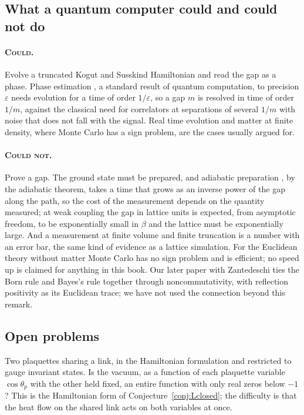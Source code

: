 \subsection{What a quantum computer could and could not do}

\paragraph{\normalfont\scshape Could.} Evolve a truncated Kogut and Susskind Hamiltonian and read the gap as a phase. Phase estimation \cite{Ki95}, a standard result of quantum computation, to precision $\varepsilon$ needs evolution for a time of order $1/\varepsilon$, so a gap $m$ is resolved in time of order $1/m$, against the classical need for correlators at separations of several $1/m$ with noise that does not fall with the signal. Real time evolution and matter at finite density, where Monte Carlo has a sign problem, are the cases usually argued for.

\paragraph{\normalfont\scshape Could not.} Prove a gap. The ground state must be prepared, and adiabatic preparation \cite{FGGS00}, by the adiabatic theorem, takes a time that grows as an inverse power of the gap along the path, so the cost of the measurement depends on the quantity measured; at weak coupling the gap in lattice units is expected, from asymptotic freedom, to be exponentially small in $\beta$ and the lattice must be exponentially large. And a measurement at finite volume and finite truncation is a number with an error bar, the same kind of evidence as a lattice simulation. For the Euclidean theory without matter Monte Carlo has no sign problem and is efficient; no speed up is claimed for anything in this book. Our later paper with Zantedeschi \cite{PSZ26} ties the Born rule and Bayes's rule together through noncommutativity, with reflection positivity as its Euclidean trace; we have not used the connection beyond this remark.

\subsection{Open problems}

\begin{problem}\label{op:twoplaquettes}
Two plaquettes sharing a link, in the Hamiltonian formulation and restricted to gauge invariant states. Is the vacuum, as a function of each plaquette variable $\cos\theta_p$ with the other held fixed, an entire function with only real zeros below $-1$? This is the Hamiltonian form of Conjecture~\ref{conj:Lclosed}; the difficulty is that the heat flow on the shared link acts on both variables at once.
\end{problem}

